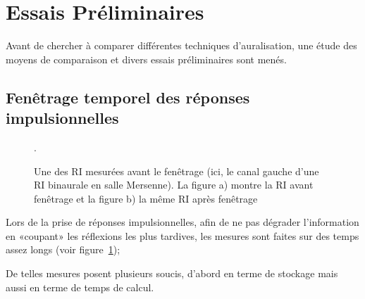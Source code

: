 \section{Essais Préliminaires}

Avant de chercher à comparer différentes techniques d'auralisation, une étude des moyens de comparaison et divers
essais préliminaires sont menés.

%

\subsection{Fenêtrage temporel des réponses impulsionnelles} %

\begin{figure}[h!]
\caption{\label{ri_non_recoupee}Une des RI mesurées avant le fenêtrage (ici, le canal gauche d'une RI binaurale en salle
Mersenne). La figure a) montre la RI avant fenêtrage et la figure b) la même RI après fenêtrage}.
\end{figure}

Lors de la prise de réponses impulsionnelles, afin de ne pas dégrader l'information en «coupant» les réflexions les plus
tardives, les mesures sont faites sur des temps assez longs (voir figure~\ref{ri_non_recoupee});

De telles mesures posent plusieurs soucis, d'abord en terme de stockage mais aussi en terme de temps de calcul.

